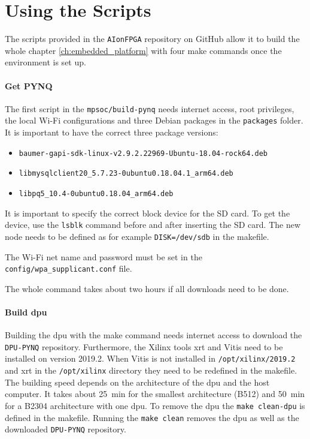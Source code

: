 \section{Using the Scripts}
\label{sec:embedded_platform:using_scripts}

The scripts provided in the \texttt{AIonFPGA} repository on GitHub allow it to build the whole chapter \ref{ch:embedded_platform} with four make commands once the environment is set up.

\paragraph{Get PYNQ}
The first script in the \texttt{mpsoc/build-pynq} needs internet access, root privileges, the local Wi-Fi configurations and three Debian packages in the \texttt{packages} folder.
It is important to have the correct three package versions:
\begin{itemize}
	 \item \texttt{baumer-gapi-sdk-linux-v2.9.2.22969-Ubuntu-18.04-rock64.deb}
	 \item \texttt{libmysqlclient20\_5.7.23-0ubuntu0.18.04.1\_arm64.deb}
	 \item \texttt{libpq5\_10.4-0ubuntu0.18.04\_arm64.deb}
\end{itemize}

It is important to specify the correct block device for the SD card.
To get the device, use the \texttt{lsblk} command before and after inserting the SD card.
The new node needs to be defined as for example \texttt{DISK=/dev/sdb} in the makefile.

The Wi-Fi net name and password must be set in the \texttt{config/wpa\_supplicant.conf} file.

The whole command takes about two hours if all downloads need to be done.

\paragraph{Build \acrshort{dpu}}
Building the \acrshort{dpu} with the make command needs internet access to download the \texttt{DPU-PYNQ} repository.
Furthermore, the Xilinx tools \acrshort{xrt} and Vitis need to be installed on version 2019.2.
When Vitis is not installed in \texttt{/opt/xilinx/2019.2} and \acrshort{xrt} in the \texttt{/opt/xilinx} directory they need to be redefined in the makefile.
The building speed depends on the architecture of the \acrshort{dpu} and the host computer.
It takes about \SI{25}{min} for the smallest architecture (B512) and \SI{50}{min} for a B2304 architecture with one \acrshort{dpu}.
To remove the \acrshort{dpu} the \texttt{make clean-dpu} is defined in the makefile.
Running the \texttt{make clean} removes the \acrshort{dpu} as well as the downloaded \texttt{DPU-PYNQ} repository.

